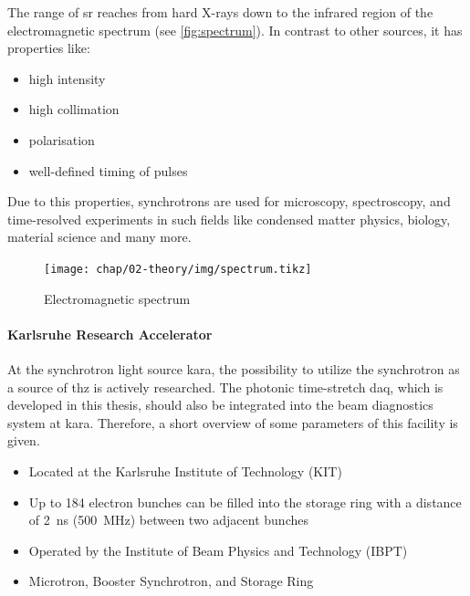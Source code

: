 The range of \gls{sr} reaches from hard X-rays down to the infrared region of the electromagnetic spectrum (see \autoref{fig:spectrum}). In contrast to other sources, it has properties like:
\begin{itemize}[noitemsep]
	\item high intensity 
	\item high collimation
	\item polarisation
	\item well-defined timing of pulses
\end{itemize}

Due to this properties, synchrotrons are used for microscopy, spectroscopy, and time-resolved experiments in such fields like condensed matter physics, biology, material science and many more.
\begin{figure}[H]
	\centering
	\texttt{[image: chap/02-theory/img/spectrum.tikz]}
	\caption{Electromagnetic spectrum} %
	\label{fig:spectrum}
\end{figure}


\paragraph{Karlsruhe Research Accelerator}
At the synchrotron light source \gls{kara}, the possibility to utilize the synchrotron as a source of \gls{thz} is actively researched. The photonic time-stretch \gls{daq}, which is developed in this thesis, should also be integrated into the beam diagnostics system at \gls{kara}. Therefore, a short overview of some parameters of this facility is given.

\begin{itemize}[noitemsep]
	\item Located at the Karlsruhe Institute of Technology (KIT)
	\item Up to 184 electron bunches can be filled into the storage ring with a distance of \SI{2}{\nano\second} (\SI{500}{\mega\hertz}) between two adjacent bunches
	\item Operated by the Institute of Beam Physics and Technology (IBPT)
	\item Microtron, Booster Synchrotron, and Storage Ring
\end{itemize}


